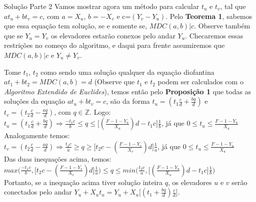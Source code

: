\documentclass[final,hyperref={pdfpagelabels=false}]{beamer}
\begin{document}
\begin{frame}[t]
\begin{columns}[t]
\begin{column}{.465\textwidth}
\begin{block}{Solução Parte 2}
Vamos mostrar agora um método para calcular $t_u$ e $t_v$, tal que $at_u + bt_v = c$, com $a=X_u$, $b=-X_v$ e c=$(Y_v-Y_u)$.
Pelo \textbf{Teorema 1}, sabemos que essa equação tem solução, se e somente se, $MDC(a,b)|c$. Observe também que se $Y_u=Y_v$ os elevadores estarão
conexos pelo andar $Y_u$. Checaremos essas restrições no começo do algoritmo, e daqui para frente assumiremos que $MDC(a,b)|c$ e $Y_u\neq Y_v$.

Tome $t_1$, $t_2$ como sendo uma solução qualquer da equação diofantina $at_1+bt_2 = MDC(a,b)=d$ (Observe que $t_1$ e $t_2$ podem ser calculados com o \textit{Algoritmo Extendido de Euclides}), temos então pelo \textbf{Proposição 1} que todas as soluções da
equação $at_u + bt_v = c$, são da forma $t_u = (t_1\frac{c}{d} + \frac{bq}{d})$ e $t_v = (t_2\frac{c}{d} - \frac{aq}{d})$, com $q \in\mathbb{Z}$. Logo:
\\

$t_u = (t_1\frac{c}{d} + \frac{bq}{d}) \Rightarrow \frac{-t_1c}{b} \leq q \leq \big[(\frac{F-1-Y_u}{X_u})d - t_1c\big]\frac{1}{b}$, já que $0\leq t_u\leq \frac{F-1-Y_u}{X_u}$
\\

Analogamente temos:
\\

$t_v = (t_2\frac{c}{d} - \frac{aq}{d}) \Rightarrow \frac{t_2c}{a} \geq q \geq \big[t_2c - (\frac{F-1-Y_v}{X_v})d\big]\frac{1}{a}$, já que $0\leq t_u\leq \frac{F-1-Y_u}{X_u}$
\\

Das duas inequações acima, temos:
\\

$max\Big(\frac{-t_1c}{b}, \big[t_2c - (\frac{F-1-Y_v}{X_v})d\big]\frac{1}{a} \Big) \leq q \leq min\Big(\frac{t_2c}{a}, \big[(\frac{F-1-Y_u}{X_u})d - t_1c\big]\frac{1}{b}  \Big)$
\\

Portanto, se a inequação acima tiver solução inteira $q$, os elevadores $u$ e $v$ serão conectados pelo andar $Y_u+X_ut_u = Y_u+X_u\big[(t_1 + \frac{bq}{d})\frac{c}{d}\big]$.
\\
\end{block}




     


\end{column}
\end{columns}
\end{frame}
\end{document}
